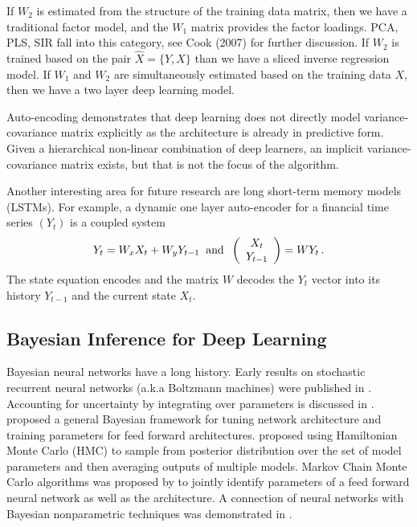 \documentclass[12pt]{article}
\begin{document}
If $ W_2$ is estimated from the structure of the training data matrix, then we have a traditional factor model, and the
$W_1$ matrix provides the factor loadings. PCA, PLS, SIR  fall into this category, see Cook (2007) for further discussion. 
If $W_2$ is trained based on the pair $\hat{X}=\{Y,X\}$ than we have a sliced inverse regression model. If $W_1$ and $W_2$ are simultaneously estimated based on the training data $X$, then we have a two layer deep learning model. 

Auto-encoding demonstrates that deep learning does not directly model variance-covariance matrix explicitly as the architecture is already in predictive form.
Given a hierarchical non-linear combination of deep learners, an implicit variance-covariance matrix exists, but that is not the focus of the algorithm. 

Another interesting area for future research are long short-term memory models (LSTMs).
For example, a dynamic one layer auto-encoder for a financial time series $(Y_t)$ is a coupled system
$$
Y_t = W_x X _t + W_y Y_{t-1} \; \; {\rm and} \; \; \left ( \begin{array}{c}
X_t\\
Y_{t-1} 
\end{array}
\right ) = W Y_t\,.
$$
The state equation encodes and 
the matrix $W$ decodes the $Y_t$ vector into its history $Y_{t-1}$ and the current state $X_t$.


\subsection{Bayesian Inference for Deep Learning}
Bayesian neural networks have a long history.  Early results on stochastic recurrent neural networks (a.k.a Boltzmann machines) were published in  \cite{ackley1985learning}. 
Accounting for uncertainty by integrating over parameters is discussed in \cite{denker1987large}. \cite{mackay1992practical} proposed a general Bayesian framework for tuning network architecture and training parameters for feed forward architectures.  \cite{neal1993bayesian}  proposed using Hamiltonian Monte Carlo (HMC) to sample from posterior distribution over the set of model parameters and then averaging outputs of multiple models. Markov Chain Monte Carlo algorithms was proposed by \cite{muller_issues_1998} to jointly identify parameters of a feed forward neural network as well as the architecture. A connection of neural networks with Bayesian nonparametric techniques was demonstrated in \cite{lee_bayesian_2004}. 
\end{document}
